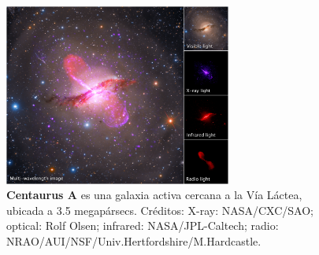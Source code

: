 \begin{frame}{}
\begin{columns}
\begin{column}{0.5\textwidth}
            \end{column}

            \begin{column}{0.5\textwidth}
                \centering

                \vspace*{0.5cm} %
                \begin{figure}
                    \centering
				    \includegraphics[width=0.7\textwidth]{Figures/centaurusA_multiwavelength.png}
				    \caption{\tiny \textbf{Centaurus A} es una galaxia activa cercana a la Vía Láctea, ubicada a 3.5 megapársecs. Créditos: X-ray: NASA/CXC/SAO; optical: Rolf Olsen; infrared: NASA/JPL-Caltech; radio: NRAO/AUI/NSF/Univ.Hertfordshire/M.Hardcastle.}
                \end{figure}            
            \end{column}
        \end{columns}
    \end{frame}  


